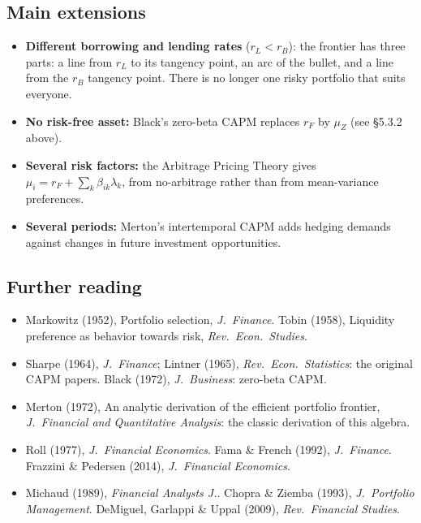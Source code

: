 \documentclass[titlepage,11pt,a4paper]{article}
\begin{document}
\subsection{Main extensions}
\begin{itemize}
  \item \textbf{Different borrowing and lending rates} ($r_L<r_B$): the frontier has three parts: a line from $r_L$ to its tangency point, an arc of the bullet, and a line from the $r_B$ tangency point. There is no longer one risky portfolio that suits everyone.
  \item \textbf{No risk-free asset:} Black's zero-beta CAPM replaces $r_F$ by $\mu_Z$ (see \S5.3.2 above).
  \item \textbf{Several risk factors:} the Arbitrage Pricing Theory gives $\mu_i=r_F+\sum_k\beta_{ik}\lambda_k$, from no-arbitrage rather than from mean-variance preferences.
  \item \textbf{Several periods:} Merton's intertemporal CAPM adds hedging demands against changes in future investment opportunities.
\end{itemize}

\subsection{Further reading}
{\small
\begin{itemize}
  \item Markowitz (1952), Portfolio selection, \emph{J.\ Finance}. Tobin (1958), Liquidity preference as behavior towards risk, \emph{Rev.\ Econ.\ Studies}.
  \item Sharpe (1964), \emph{J.\ Finance}; Lintner (1965), \emph{Rev.\ Econ.\ Statistics}: the original CAPM papers. Black (1972), \emph{J.\ Business}: zero-beta CAPM.
  \item Merton (1972), An analytic derivation of the efficient portfolio frontier, \emph{J.\ Financial and Quantitative Analysis}: the classic derivation of this algebra.
  \item Roll (1977), \emph{J.\ Financial Economics}. Fama \& French (1992), \emph{J.\ Finance}. Frazzini \& Pedersen (2014), \emph{J.\ Financial Economics}.
  \item Michaud (1989), \emph{Financial Analysts J.}. Chopra \& Ziemba (1993), \emph{J.\ Portfolio Management}. DeMiguel, Garlappi \& Uppal (2009), \emph{Rev.\ Financial Studies}.
\end{itemize}}

\end{document}
